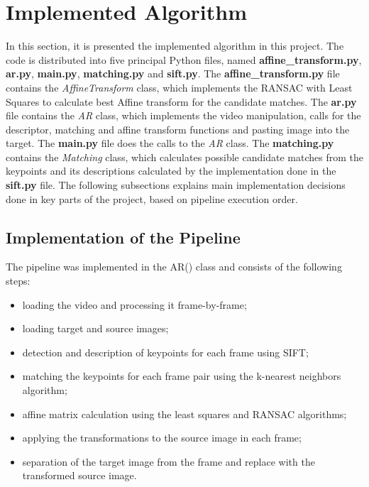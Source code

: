 \documentclass[]{IEEEtran}
\begin{document}
\section{Implemented Algorithm}
In this section, it is presented the implemented algorithm in this project. The code is distributed into five principal Python files, named \textbf{affine\_transform.py}, \textbf{ar.py}, \textbf{main.py}, \textbf{matching.py} and \textbf{sift.py}. The \textbf{affine\_transform.py} file contains the \textit{AffineTransform} class, which implements the RANSAC with Least Squares to calculate best Affine transform for the candidate matches. The \textbf{ar.py} file contains the \textit{AR} class, which implements the video manipulation, calls for the descriptor, matching and affine transform functions and pasting image into the target. The \textbf{main.py} file does the calls to the \textit{AR} class. The \textbf{matching.py} contains the \textit{Matching} class, which calculates possible candidate matches from the keypoints and its descriptions calculated by the implementation done in the \textbf{sift.py} file. The following subsections explains main implementation decisions done in key parts of the project, based on pipeline execution order.


\subsection{Implementation of the Pipeline}

The pipeline was implemented in the AR() class and consists of the following steps:

\begin{itemize}
  \item loading the video and processing it frame-by-frame;
  \item loading target and source images;
  \item detection and description of keypoints for each frame using SIFT;
  \item matching the keypoints for each frame pair using the k-nearest neighbors algorithm;
  \item affine matrix calculation using the least squares and RANSAC algorithms;
  \item applying the transformations to the source image in each frame;
  \item separation of the target image from the frame and replace with the transformed source image. 
\end{itemize}
\end{document}
